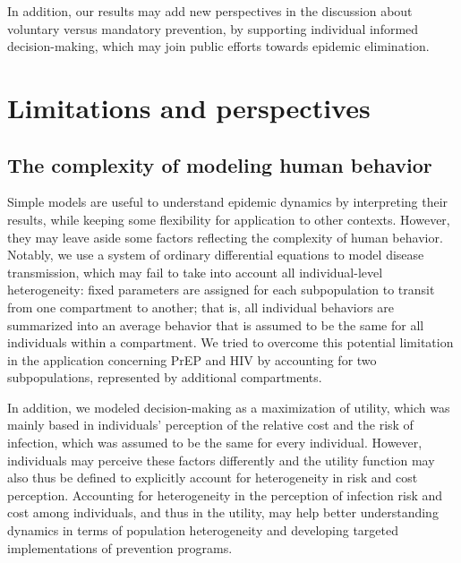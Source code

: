 In addition, our results may add new perspectives in the discussion about voluntary versus mandatory prevention, by supporting individual informed decision-making, which may join public efforts towards epidemic elimination.

\section{Limitations and perspectives}

\subsection{The complexity of modeling human behavior}
Simple models are useful to understand epidemic dynamics by interpreting their results, while keeping some flexibility for application to other contexts. However, they may leave aside some factors reflecting the complexity of human behavior. Notably, we use a system of ordinary differential equations to model disease transmission, which may fail to take into account all individual-level heterogeneity: fixed parameters are assigned for each subpopulation to transit from one compartment to another; that is, all individual behaviors are summarized into an average behavior that is assumed to be the same for all individuals within a compartment. We tried to overcome this potential limitation in the application concerning PrEP and HIV by accounting for two subpopulations, represented by additional compartments. 

In addition, we modeled decision-making as a maximization of utility, which was mainly based in individuals' perception of the relative cost and the risk of infection, which was assumed to be the same for every individual. However, individuals may perceive these factors differently and the utility function may also thus be defined to explicitly account for heterogeneity in risk and cost perception. Accounting for heterogeneity in the perception of infection risk and cost among individuals, and thus in the utility, may help better understanding dynamics in terms of population heterogeneity and developing targeted implementations of prevention programs.


